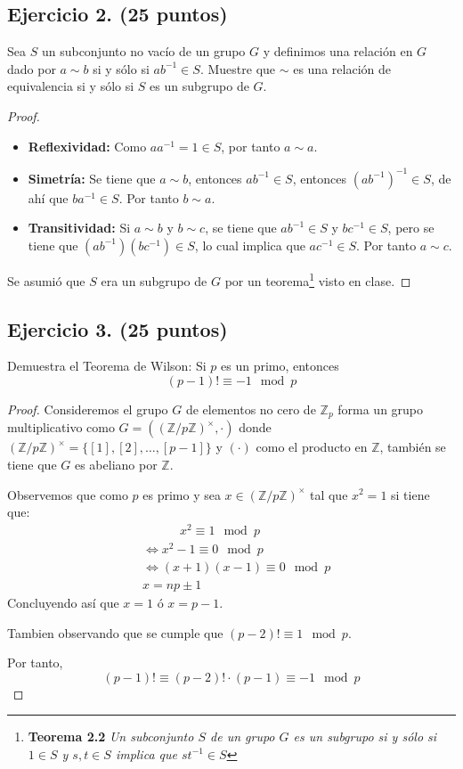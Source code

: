 \documentclass[letterpaper]{article}
\newcommand{\Z}{\mathbb{Z}}
\begin{document}
\subsection*{Ejercicio 2. (25 puntos)}
Sea $S$ un subconjunto no vacío de un grupo $G$ y definimos una relación en $G$ dado por $a \sim b$ si y
sólo si $ab^{-1} \in S$. Muestre que $\sim$ es una relación de equivalencia si y sólo si $S$ es un subgrupo
de $G$.

\begin{proof}
\hfill
\begin{itemize}
    \item \textbf{Reflexividad:} Como $aa^{-1} = 1 \in S$, por tanto $a \sim a$.

    \item \textbf{Simetría:} Se tiene que $a \sim b$, entonces $ab^{-1} \in S$, entonces $(ab^{-1})^{-1} \in S$,
    de ahí que $ba^{-1} \in S$. Por tanto $b \sim a$.

    \item \textbf{Transitividad:} Si $a \sim b$ y $b \sim c$, se tiene que $ab^{-1} \in S$ y $bc^{-1} \in S$, pero se
    tiene que $(ab^{-1})(bc^{-1}) \in S$, lo cual implica que $ac^{-1} \in S$. Por tanto $a \sim c$.
\end{itemize}

Se asumió que $S$ era un subgrupo de $G$ por un teorema\footnote{
    \textbf{Teorema 2.2} \emph{Un subconjunto $S$ de un grupo $G$ es un subgrupo si y sólo si $1 \in S$ y
    $s, t \in S$ implica que $st^{-1} \in S$}
} visto en clase.
\end{proof}

\subsection*{Ejercicio 3. (25 puntos)}
Demuestra el Teorema de Wilson: Si $p$ es un primo, entonces
\[
    (p - 1)! \equiv -1 \mod p
\]

\begin{proof}
Consideremos el grupo $G$ de elementos no cero de $\Z_p$ forma un grupo multiplicativo como
$G = ((\Z/p\Z)^\times, \cdot)$ donde $(\Z/p\Z)^\times = \{ [1], [2], \ldots, [p-1] \}$ y $(\cdot)$
como el producto en $\Z$, también se tiene que $G$ es abeliano por $\Z$.

Observemos que como $p$ es primo y sea $x \in (\Z/p\Z)^\times$ tal que $x^2 = 1$ si tiene que:
\begin{align*}
    &\qquad\quad x^2 \equiv 1 \mod p\\
    &\iff x^2 -1 \equiv 0 \mod p\\
    &\iff (x+1)(x-1) \equiv 0 \mod p\\
    &x = np \pm 1
\end{align*}
Concluyendo así que $x = 1$ ó $x = p-1$.

Tambien observando que se cumple que $(p-2)! \equiv 1 \mod p$.

Por tanto,
\[
    (p-1)! \equiv (p-2)! \cdot (p-1) \equiv -1 \mod p
\]
\end{proof}
\end{document}
